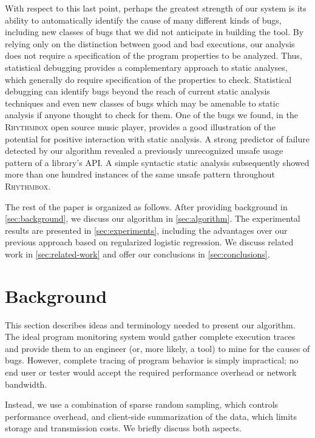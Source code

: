 \documentclass[preprint,final]{sigplanconf}
\newcommand{\rhythmbox}{\textsc{Rhythmbox}\xspace}
\begin{document}
With respect to this last point, perhaps the greatest strength of our
system is its ability to automatically identify the cause of many
different kinds of bugs, including new classes of bugs that we did not
anticipate in building the tool.  By relying only on the distinction
between good and bad executions, our analysis does not require a
specification of the program properties to be analyzed.  Thus,
statistical debugging provides a complementary approach to static
analyses, which generally do require specification of the properties
to check.  Statistical debugging can identify bugs beyond the reach of
current static analysis techniques and even new classes of bugs which may be
amenable to static analysis if anyone thought to check for them.
One of the bugs we found, in the \rhythmbox open source music player,
provides a good illustration of the potential for positive interaction
with static analysis.  A strong predictor of failure detected by our
algorithm revealed a previously unrecognized unsafe usage pattern of a
library's API\@.  A simple syntactic static analysis subsequently showed
more than one hundred instances of the same unsafe pattern throughout
\rhythmbox.

The rest of the paper is organized as follows.  After providing background
in \autoref{sec:background}, we discuss our algorithm
in \autoref{sec:algorithm}. The experimental results are presented in
\autoref{sec:experiments}, including the advantages over our
previous approach based on regularized logistic regression.
We discuss related work in \autoref{sec:related-work} and offer our conclusions
in \autoref{sec:conclusions}.


\section{Background}
\label{sec:background}

This section describes ideas and terminology needed to present our
algorithm.  The ideal program monitoring system would gather complete
execution traces and provide them to an engineer (or, more likely, a
tool) to mine for the causes of bugs.  However, complete tracing of
program behavior is simply impractical; no end user or tester would accept the
required performance overhead or network bandwidth.

Instead, we use a combination of sparse random sampling, which controls
performance overhead, and client-side summarization of the data, which
limits storage and transmission costs.  We briefly discuss
both aspects.
\end{document}
